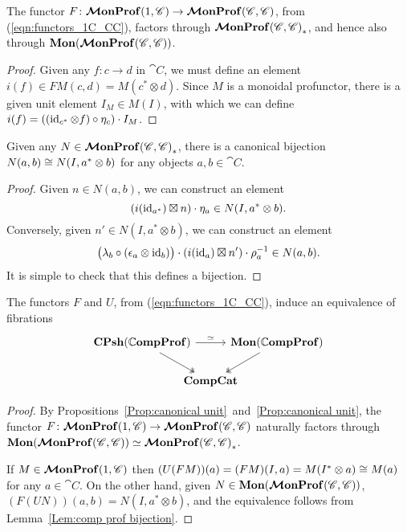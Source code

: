 \documentclass[12pt,oneside,article,draft]{memoir}
\begin{document}
\begin{proposition}\label{Prop:canonical unit}
   The functor $F\colon\bm{\mathcal{M}}\mathbf{onProf}(1,\mathscr{C})\to\bm{\mathcal{M}}\mathbf{onProf}(\mathscr{C},\mathscr{C})$, from (\ref{eqn:functors_1C_CC}), factors through $\bm{\mathcal{M}}\mathbf{onProf}{(\mathscr{C},\mathscr{C})}_*$, and hence also through $\mathbf{Mon}(\bm{\mathcal{M}}\mathbf{onProf}(\mathscr{C},\mathscr{C}))$.
\end{proposition}
\begin{proof}
   Given any $f\colon c\to d$ in $\cat{C}$, we must define an element $i(f)\in FM(c,d)=M(c^*\otimes d)$.
   Since $M$ is a monoidal profunctor, there is a given unit element $I_M\in M(I)$, with which we can define $i(f)=((\operatorname{id}_{c^*}\otimes f)\circ\eta_c)\cdot I_M$.
\end{proof}

\begin{lemma}\label{Lem:comp prof bijection}
   Given any $N\in\bm{\mathcal{M}}\mathbf{onProf}{(\mathscr{C},\mathscr{C})}_*$, there is a canonical bijection $N(a,b)\cong N(I,a^*\otimes b)$ for any objects $a,b\in\cat{C}$.
\end{lemma}
\begin{proof}
   Given $n\in N(a,b)$, we can construct an element
   \[
      (i(\operatorname{id}_{a^*})\boxtimes n)\cdot\eta_a \in N(I,a^*\otimes b).
   \]
   Conversely, given $n'\in N(I,a^*\otimes b)$, we can construct an element
   \[
      \bigl(\lambda_b\circ(\epsilon_a\otimes\operatorname{id}_b)\bigr)\cdot(i(\operatorname{id}_a)\boxtimes n')\cdot\rho_a^{-1} \in N(a,b).
   \]
   It is simple to check that this defines a bijection.
\end{proof}

\begin{proposition}\label{Prop:mon_prof_equivalence}
   The functors $F$ and $U$, from (\ref{eqn:functors_1C_CC}), induce an equivalence of fibrations
   \begin{equation*}
      \begin{tikzcd}[column sep=-1.5em]
         \CPsh(\dCompProf) \ar[rr,"\equiv"] \ar[dr,two heads]
            && \Mon(\dCompProf) \ar[dl,two heads] \\
            & \CompCat &
      \end{tikzcd}
   \end{equation*}
\end{proposition}
\begin{proof}
   By Propositions~\ref{Prop:canonical unit}~and~\ref{Prop:canonical unit}, the functor
   $F\colon\bm{\mathcal{M}}\mathbf{onProf}(1,\mathscr{C}) \to \bm{\mathcal{M}}\mathbf{onProf}(\mathscr{C},\mathscr{C})$ naturally factors through
   $\mathbf{Mon}(\bm{\mathcal{M}}\mathbf{onProf}(\mathscr{C},\mathscr{C}))\simeq\bm{\mathcal{M}}\mathbf{onProf}{(\mathscr{C},\mathscr{C})}_*$.

   If $M\in\bm{\mathcal{M}}\mathbf{onProf}(1,\mathscr{C})$ then $(U(FM))(a)=(FM)(I,a)=M(I^*\otimes a)\cong M(a)$ for any
   $a\in\cat{C}$. On the other hand, given $N\in\mathbf{Mon}(\bm{\mathcal{M}}\mathbf{onProf}(\mathscr{C},\mathscr{C}))$,
   $(F(UN))(a,b)=N(I,a^*\otimes b)$, and the equivalence follows from Lemma~\ref{Lem:comp prof
   bijection}.
\end{proof}
\end{document}

